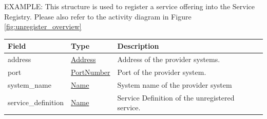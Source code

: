 \documentclass[a4paper]{arrowhead}
\newcommand{\pref}[1]{{\textcolor{ArrowheadGrey}{\hyperref[sec:model:primitives:#1]{#1}}}}
\begin{document}
\newpage

\color{red} 


EXAMPLE: This structure is used to register a service offering into
the Service Registry. Please also refer to the activity diagram in
Figure \ref{fig:unregister_overview} \color{black}

\begin{table}[ht!]
\begin{tabularx}{\textwidth}{| p{4.25cm} | p{3.5cm} | X |} \hline
\rowcolor{gray!33} Field & Type      & Description \\ \hline
address                 & \pref{Address} & Address of the provider systems. \\ \hline
port                   & \pref{PortNumber}     & Port of the provider system. \\ \hline
system\_name                  & \pref{Name}     & System name of the provider system \\ \hline
service\_definition                    & \pref{Name} & Service Definition of the unregistered service. \\ \hline
\end{tabularx}
\end{table}
\end{document}
